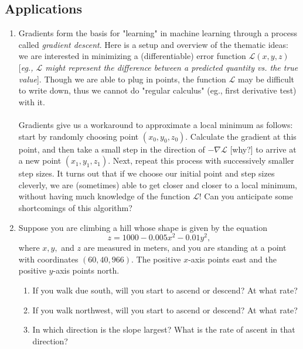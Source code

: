\subsection*{Applications}
\begin{enumerate}[resume]
    \item Gradients form the basis for "learning" in machine learning through a process called \textit{gradient descent}. Here is a setup and overview of the thematic ideas: we are interested in minimizing a (differentiable) error function $\mathcal{L}(x,y,z)$ [\textit{eg., $\mathcal{L}$ might represent the difference between a predicted quantity vs. the true value}]. Though we are able to plug in points, the function $\mathcal{L}$ may be difficult to write down, thus we cannot do "regular calculus" (eg., first derivative test) with it. \\\\
    Gradients give us a workaround to approximate a local minimum as follows: start by randomly choosing point $(x_0,y_0,z_0)$. Calculate the gradient at this point, and then take a small step in the direction of $-\nabla \mathcal{L}$ [why?] to arrive at a new point $(x_1,y_1,z_1)$. Next, repeat this process with successively smaller step sizes. It turns out that if we choose our initial point and step sizes cleverly, we are (sometimes) able to get closer and closer to a local minimum, without having much knowledge of the function $\mathcal{L}$! Can you anticipate some shortcomings of this algorithm? 
    \item Suppose you are climbing a hill whose shape is given by the equation
	\[ z = 1000 - 0.005x^2-0.01y^2, \]
	where $x, y,$ and $z$ are measured in meters, and you are standing at a point with
	coordinates $(60, 40, 966)$. The positive $x$-axis points east and the positive $y$-axis
	points north.
	\begin{enumerate}
		\item If you walk due south, will you start to ascend or descend? At what rate?
		\item If you walk northwest, will you start to ascend or descend? At what rate?
		\item In which direction is the slope largest? What is the rate of ascent in that direction?
	\end{enumerate} 
\end{enumerate}
